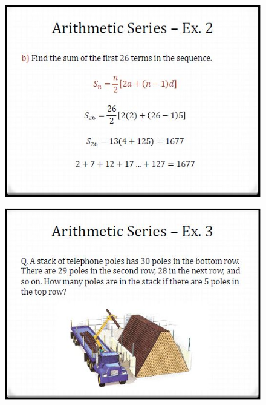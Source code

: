 \documentclass{beamer}
\begin{document}
\begin{frame}
	\begin{figure}
		\centering
		\includegraphics[width=0.99\linewidth]{SeqSer18A}
	\end{figure}
	
\end{frame}	
\begin{frame}
	\begin{figure}
		\centering
		\includegraphics[width=0.99\linewidth]{SeqSer18B}
	\end{figure}
	
\end{frame}
\end{document}
